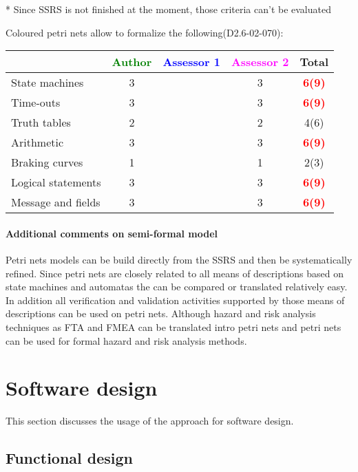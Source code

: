 \begin{assessor2}
* Since SSRS is not finished at the moment, those criteria can't be evaluated
\end{assessor2}

Coloured petri nets allow to formalize the following(D2.6-02-070):

\begin{tabular}{|l | c | c | c | c|}
\hline
& \textcolor{green}{Author} & \textcolor{blue}{Assessor 1} & \textcolor{magenta}{Assessor 2} & Total \\
\hline 
State machines  & 3     & & 3     &\textcolor{red}{\textbf{6(9)}}  \\
\hline
Time-outs  & 3     & & 3     &\textcolor{red}{\textbf{6(9)}}  \\
\hline
Truth tables  & 2     & & 2     &  4(6) \\
\hline
Arithmetic  & 3     & & 3     & \textcolor{red}{\textbf{6(9)}}   \\
\hline
Braking curves  & 1     & & 1     &  2(3) \\
\hline
Logical statements & 3     & & 3     & \textcolor{red}{\textbf{6(9)}}   \\
\hline
Message and fields & 3     & & 3     & \textcolor{red}{\textbf{6(9)}}   \\
\hline
\end{tabular}

\paragraph{Additional comments on semi-formal  model} 
Petri nets models can be build directly from the SSRS and then be systematically refined. 
Since petri nets are closely related to all means of descriptions based on state machines and automatas the can be compared or translated relatively easy. In addition all verification and validation activities supported by those means of descriptions can be used on petri nets. Although hazard and risk analysis techniques as FTA and FMEA can be translated intro petri nets and petri nets can be used for formal hazard and risk analysis methods.


\section{Software design}
This section discusses the usage of the approach for software design.

\subsection{Functional design}

